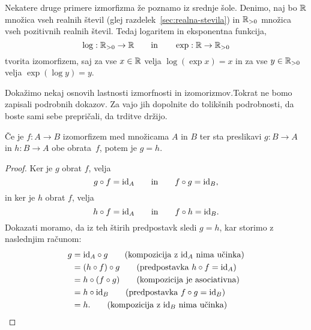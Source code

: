 \begin{zgled}\label{zgled:logaritmiranje-je-obratno-od-eksponenciranja}
  Nekatere druge primere izmorfizma že poznamo iz srednje šole. Denimo, naj bo $\RR$
  množica vseh realnih števil (glej razdelek~\ref{sec:realna-stevila}) in $\RR_{>0}$
  množica vseh pozitivnih realnih števil. Tedaj logaritem in eksponentna funkcija,
  \begin{equation*}
    \log : \RR_{>0} \to \RR
    \qquad\text{in}\qquad
    \exp : \RR \to \RR_{>0}
  \end{equation*}
  tvorita izomorfizem, saj za vse $x \in \RR$ velja $\log (\exp x) = x$ in za vse
  $y \in \RR_{>0}$ velja $\exp (\log y) = y$.
\end{zgled}

Dokažimo nekaj osnovih lastnosti izmorfnosti in izomorizmov.Tokrat ne bomo zapisali
podrobnih dokazov. Za vajo jih dopolnite do tolikšnih podrobnosti, da boste sami sebe
prepričali, da trditve držijo.

\begin{trditev}
  Če je $f : A \to B$ izomorfizem med množicama $A$ in $B$ ter sta preslikavi
  $g : B \to A$ in $h : B \to A$ obe obrata~$f$, potem je $g = h$.
\end{trditev}

\begin{proof}
  Ker je $g$ obrat $f$, velja
  \begin{equation*}
    g \circ f = \id[A]
    \qquad\text{in}\qquad
    f \circ g = \id[B],
  \end{equation*}
  in ker je $h$ obrat $f$, velja
  \begin{equation*}
    h \circ f = \id[A]
    \qquad\text{in}\qquad
    f \circ h = \id[B].
  \end{equation*}
  Dokazati moramo, da iz teh štirih predpostavk sledi $g = h$, kar storimo z naslednjim
  računom:
  \begin{align*}
    g
    &= \id[A] \circ g \tag{kompozicija z $\id[A]$ nima učinka} \\
    &= (h \circ f) \circ g \tag{predpostavka $h \circ f = \id[A]$} \\
    &= h \circ (f \circ g) \tag{kompozicija je asociativna} \\
    &= h \circ \id[B] \tag{predpostavka $f \circ g = \id[B]$} \\
    &= h. \tag{kompozicija z $\id[B]$ nima učinka}
  \end{align*}
\end{proof}

